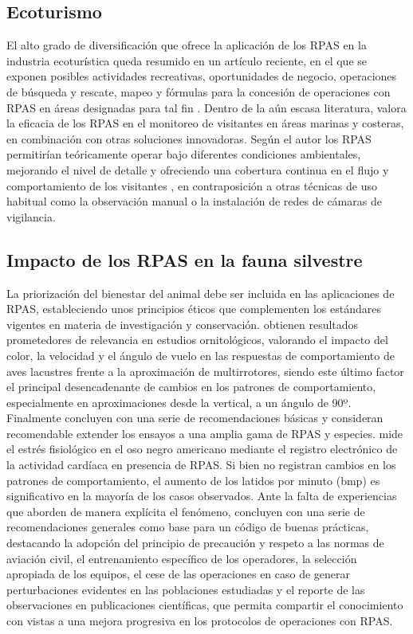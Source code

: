 \documentclass[onecolumn]{extarticle}
\begin{document}
\subsection{Ecoturismo}\label{ecoturismo}

El alto grado de diversificación que ofrece la aplicación de los RPAS en
la industria ecoturística queda resumido en un artículo reciente, en el
que se exponen posibles actividades recreativas, oportunidades de
negocio, operaciones de búsqueda y rescate, mapeo y fórmulas para la
concesión de operaciones con RPAS en áreas designadas para tal fin
\citep{King2014}. Dentro de la aún escasa literatura, \citep{Hansen2016}
valora la eficacia de los RPAS en el monitoreo de visitantes en áreas
marinas y costeras, en combinación con otras soluciones innovadoras.
Según el autor los RPAS permitirían teóricamente operar bajo diferentes
condiciones ambientales, mejorando el nivel de detalle y ofreciendo una
cobertura continua en el flujo y comportamiento de los visitantes , en
contraposición a otras técnicas de uso habitual como la observación
manual o la instalación de redes de cámaras de vigilancia.

\subsection{Impacto de los RPAS en la fauna
silvestre}\label{impacto-de-los-rpas-en-la-fauna-silvestre}

La priorización del bienestar del animal debe ser incluida en las
aplicaciones de RPAS, estableciendo unos principios éticos que
complementen los estándares vigentes en materia de investigación y
conservación. \citep{Vas2015} obtienen resultados prometedores de
relevancia en estudios ornitológicos, valorando el impacto del color, la
velocidad y el ángulo de vuelo en las respuestas de comportamiento de
aves lacustres frente a la aproximación de multirrotores, siendo este
último factor el principal desencadenante de cambios en los patrones de
comportamiento, especialmente en aproximaciones desde la vertical, a un
ángulo de 90º. Finalmente concluyen con una serie de recomendaciones
básicas y consideran recomendable extender los ensayos a una amplia gama
de RPAS y especies. \citep{Ditmer2015} mide el estrés fisiológico en el
oso negro americano mediante el registro electrónico de la actividad
cardíaca en presencia de RPAS. Si bien no registran cambios en los
patrones de comportamiento, el aumento de los latidos por minuto (bmp)
es significativo en la mayoría de los casos observados. Ante la falta de
experiencias que aborden de manera explícita el fenómeno,
\citep{Hodgson2016a} concluyen con una serie de recomendaciones
generales como base para un código de buenas prácticas, destacando la
adopción del principio de precaución y respeto a las normas de aviación
civil, el entrenamiento específico de los operadores, la selección
apropiada de los equipos, el cese de las operaciones en caso de generar
perturbaciones evidentes en las poblaciones estudiadas y el reporte de
las observaciones en publicaciones científicas, que permita compartir el
conocimiento con vistas a una mejora progresiva en los protocolos de
operaciones con RPAS.
\end{document}
